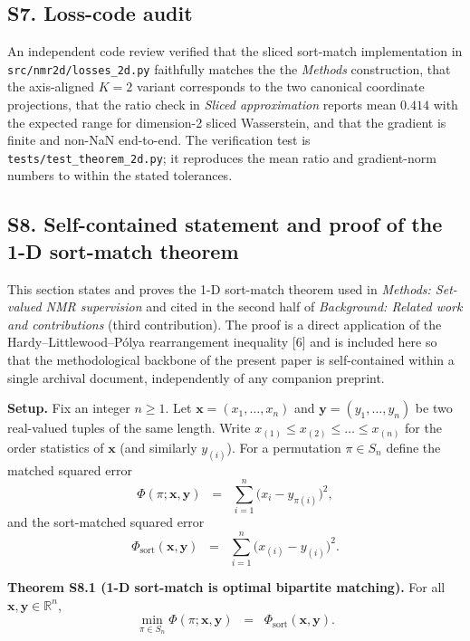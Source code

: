 \documentclass[
  11pt,
  a4paper,
]{article}
\begin{document}
\subsection*{S7. Loss-code audit}

An independent code review verified that the sliced sort-match
implementation in \texttt{src/nmr2d/losses\_2d.py} faithfully matches the
the \emph{Methods} construction, that the axis-aligned \(K=2\) variant corresponds
to the two canonical coordinate projections, that the ratio check in
\emph{Sliced approximation} reports mean \(0.414\) with the expected range for
dimension-2 sliced Wasserstein, and that the gradient is finite and
non-NaN end-to-end. The verification test is
\texttt{tests/test\_theorem\_2d.py}; it reproduces the mean ratio and
gradient-norm numbers to within the stated tolerances.

\subsection*{S8. Self-contained statement and proof of the 1-D sort-match theorem}

This section states and proves the 1-D sort-match theorem used in
\emph{Methods: Set-valued NMR supervision} and cited in the second half
of \emph{Background: Related work and contributions} (third contribution).
The proof is a direct application of the Hardy--Littlewood--Pólya
rearrangement inequality {[}6{]} and is included here so that the
methodological backbone of the present paper is self-contained
within a single archival document, independently of any companion
preprint.

\textbf{Setup.} Fix an integer \(n \geq 1\). Let
\(\mathbf{x} = (x_{1}, \dots, x_{n})\) and
\(\mathbf{y} = (y_{1}, \dots, y_{n})\) be two real-valued tuples of
the same length. Write
\(x_{(1)} \leq x_{(2)} \leq \dots \leq x_{(n)}\) for the order
statistics of \(\mathbf{x}\) (and similarly \(y_{(i)}\)). For a
permutation \(\pi \in S_{n}\) define the matched squared error
\[
\Phi(\pi; \mathbf{x}, \mathbf{y})
\;\;=\;\;
\sum_{i=1}^{n} \bigl(x_{i} - y_{\pi(i)}\bigr)^{2},
\]
and the sort-matched squared error
\[
\Phi_{\mathrm{sort}}(\mathbf{x}, \mathbf{y})
\;\;=\;\;
\sum_{i=1}^{n} \bigl(x_{(i)} - y_{(i)}\bigr)^{2}.
\]

\textbf{Theorem S8.1 (1-D sort-match is optimal bipartite matching).} For
all \(\mathbf{x}, \mathbf{y} \in \mathbb{R}^{n}\),
\[
\min_{\pi \in S_{n}}
   \Phi(\pi; \mathbf{x}, \mathbf{y})
\;\;=\;\;
\Phi_{\mathrm{sort}}(\mathbf{x}, \mathbf{y}).
\]
\end{document}
